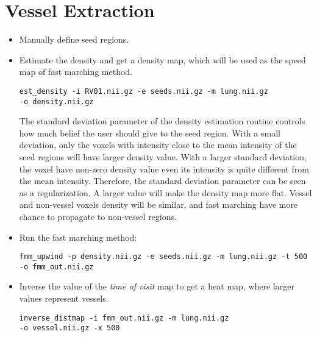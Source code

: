 \documentclass[12pt]{article}
\begin{document}
\section{Vessel Extraction}
\begin{itemize}
\item Manually define seed regions.

\item Estimate the density and get a density map, which will be used as the
  speed map of fast marching method. 
\begin{Verbatim}[frame=single]
est_density -i RV01.nii.gz -e seeds.nii.gz -m lung.nii.gz 
-o density.nii.gz
\end{Verbatim}
  The standard deviation parameter of the density estimation routine controls
  how much belief the user should give to the seed region. With a small
  deviation, only the voxels with intensity close to the mean intensity of the
  seed regions will have larger density value. With a larger standard
  deviation, the voxel have non-zero density value even its intensity is quite
  different from the mean intensity. Therefore, the standard deviation
  parameter can be seen as a regularization. A larger value will make the
  density map more flat. Vessel and non-vessel voxels density will be similar,
  and fast marching have more chance to propagate to non-vessel regions.

  \item Run the fast marching method:
\begin{Verbatim}[frame=single]
fmm_upwind -p density.nii.gz -e seeds.nii.gz -m lung.nii.gz -t 500 
-o fmm_out.nii.gz
\end{Verbatim}

\item Inverse the value of the \emph{time of visit} map to get a heat map,
  where larger values represent vessels. 
\begin{Verbatim}[frame=single]
inverse_distmap -i fmm_out.nii.gz -m lung.nii.gz 
-o vessel.nii.gz -x 500
\end{Verbatim}
\end{itemize}



\end{document}
